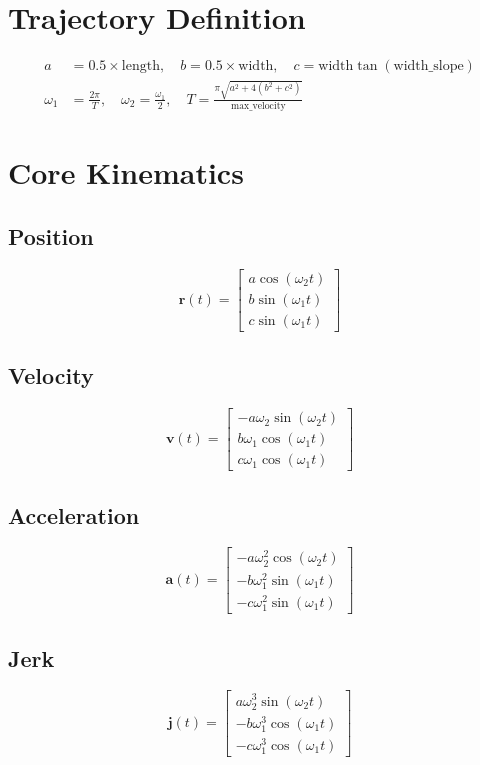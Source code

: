 \documentclass{article}
\begin{document}
	\section{Trajectory Definition}
	\begin{align*}
		a &= 0.5\times\text{length}, \quad
		b = 0.5\times\text{width}, \quad
		c = \text{width}\tan(\text{width\_slope}) \\
		\omega_1 &= \frac{2\pi}{T}, \quad
		\omega_2 = \frac{\omega_1}{2}, \quad
		T = \frac{\pi\sqrt{a^2 + 4(b^2 + c^2)}}{\text{max\_velocity}}
	\end{align*}

	\section{Core Kinematics}
	\subsection{Position}
	\[
	\bm{r}(t) = \begin{bmatrix}
		a\cos(\omega_2 t) \\
		b\sin(\omega_1 t) \\
		c\sin(\omega_1 t)
	\end{bmatrix}
	\]

	\subsection{Velocity}
	\[
	\bm{v}(t) = \begin{bmatrix}
		-a\omega_2\sin(\omega_2 t) \\
		b\omega_1\cos(\omega_1 t) \\
		c\omega_1\cos(\omega_1 t)
	\end{bmatrix}
	\]

	\subsection{Acceleration}
	\[
	\bm{a}(t) = \begin{bmatrix}
		-a\omega_2^2\cos(\omega_2 t) \\
		-b\omega_1^2\sin(\omega_1 t) \\
		-c\omega_1^2\sin(\omega_1 t)
	\end{bmatrix}
	\]

	\subsection{Jerk}
	\[
	\bm{j}(t) = \begin{bmatrix}
		a\omega_2^3\sin(\omega_2 t) \\
		-b\omega_1^3\cos(\omega_1 t) \\
		-c\omega_1^3\cos(\omega_1 t)
	\end{bmatrix}
	\]
\end{document}
